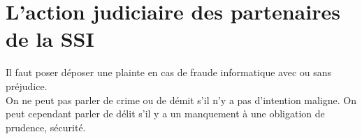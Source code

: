 \section{L'action judiciaire des partenaires de la SSI}
Il faut poser déposer une plainte en cas de fraude informatique avec ou sans préjudice.\\
On ne peut pas parler de crime ou de démit s'il n'y a pas d'intention maligne. On peut cependant parler de délit s'il y a un manquement à une obligation de prudence, sécurité.